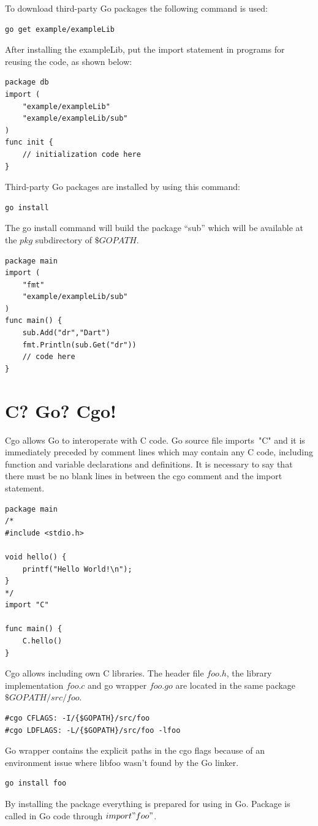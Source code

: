 \documentclass[
  digital, %
  notable,   %
  lof,     %
  lot,     %
]{fithesis3}
\begin{document}
To download third-party Go packages the following command is used: 
\begin{lstlisting}
go get example/exampleLib
\end{lstlisting}
After installing the exampleLib, put the import statement in programs for reusing the code, as 
shown below:
\begin{lstlisting}
package db
import (
	"example/exampleLib"
	"example/exampleLib/sub"
)
func init {
	// initialization code here    
}
\end{lstlisting}
Third-party Go packages are installed by using this command: 
\begin{lstlisting}
go install
\end{lstlisting}
The go install command will build the package “sub” which will be available at the $pkg$ 
subdirectory of $\$GOPATH$.
\begin{lstlisting}
package main
import (
	"fmt"
	"example/exampleLib/sub"
)
func main() {
    sub.Add("dr","Dart")
    fmt.Println(sub.Get("dr"))
    // code here    
}
\end{lstlisting}

\section{C? Go? Cgo!}\label{cgo}
Cgo allows Go to interoperate with C code. Go source file imports~"C" and it is immediately 
preceded by comment lines which may contain any C code, including function and variable 
declarations and definitions. It is necessary to say that there must be no blank lines in 
between the cgo comment and the import statement. 

\begin{lstlisting}
package main
/*
#include <stdio.h>

void hello() {
	printf("Hello World!\n");
}
*/
import "C"

func main() {
	C.hello()
}
\end{lstlisting}

Cgo allows including own C libraries. The header file $foo.h$, the library implementation 
$foo.c$ and go wrapper $foo.go$ are located in the same package $\$GOPATH/src/foo$. 
\begin{lstlisting}
#cgo CFLAGS: -I/{$GOPATH}/src/foo
#cgo LDFLAGS: -L/{$GOPATH}/src/foo -lfoo
\end{lstlisting}
Go wrapper contains the explicit paths in the cgo flags because of an environment issue where 
libfoo wasn’t found by the Go linker.
\begin{lstlisting} 
go install foo 
\end{lstlisting}
By installing the package everything is prepared for using in Go. Package is called in Go code 
through $import "foo"$.
\end{document}
